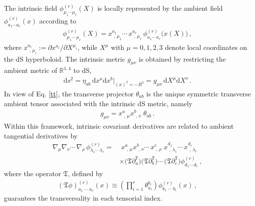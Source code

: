 \documentclass[aps,twocolumn,nofootinbib]{revtex4}
\begin{document}
The intrinsic field $\phi^{(r)}_{\mu_1\cdots\mu_r}(X)$ is locally represented by the ambient field $\phi^{(r)}_{a_1\cdots a_r}(x)$ according to
\begin{eqnarray}\label{tt}
    \phi^{(r)}_{\mu_1\cdots\,\mu_r}(X) = x^{a_1}_{\,\,,\,\mu_1}\cdots\, x^{a_r}_{\,\,,\,\mu_r} \,\phi^{(r)}_{a_1\cdots\, a_r}\big(x(X)\big) \,,
\end{eqnarray}
where $x^{a_i}_{\,\,,\,\mu_i}:=\partial x^{a_i}/\partial X^{\mu_i}$, while $X^\mu$ with $\mu=0,1,2,3$ denote local coordinates on the dS hyperboloid. The intrinsic metric $g_{\mu\nu}$ is obtained by restricting the ambient metric of $\mathbb{R}^{1,4}$ to dS,
\begin{align}
    \mathrm{d}s^2 = \eta_{ab}\,\mathrm{d}x^a \mathrm{d}x^b\Big|_{(x)^2=-R^2} = g_{\mu\nu}\,\mathrm{d}X^\mu \mathrm{d}X^\nu \,.
\end{align}
In view of Eq. \eqref{tt}, the transverse projector $\theta_{ab}$ is the unique symmetric transverse ambient tensor associated with the intrinsic dS metric, namely
\begin{align}
    g_{\mu\nu}
    =
    x^a_{\,\,,\,\mu} x^b_{\,\,,\,\nu} \;\theta_{ab} \,.
\end{align}
Within this framework, intrinsic covariant derivatives are related to ambient tangential derivatives by
\begin{align}
    \nabla_\mu \nabla_\nu \cdots\, \nabla_\rho \,\phi^{(r)}_{\lambda_1\cdots\, \lambda_r} =&\; x^a_{\,\,,\,\mu} x^b_{\,\,,\,\nu} \cdots\, x^c_{\,\,,\,\rho} \; x^{d_1}_{\,\,,\,\lambda_1} \cdots\, x^{d_r}_{\,\,,\,\lambda_r} \nonumber\\[3pt] 
    &\times \big(\mathfrak{T} {\partial}^{\texttt{T}}_a\big) \big(\mathfrak{T}{\partial}^{\texttt{T}}_b\big) \cdots\, \big(\mathfrak{T}{\partial}^{\texttt{T}}_c\big) \phi^{(r)}_{d_1\cdots\, d_r} \,,
\end{align}
where the operator $\mathfrak{T}$, defined by
\begin{eqnarray}
    (\mathfrak{T} \phi)^{(r)}_{a_1 \;\cdots\; a_r}(x) \equiv \left( \prod_{i=1}^r \theta^{b_i}_{a_i} \right) \phi^{(r)}_{b_1 \;\cdots\; b_r}(x) \,,
\end{eqnarray}
guarantees the transversality in each tensorial index.
\end{document}

